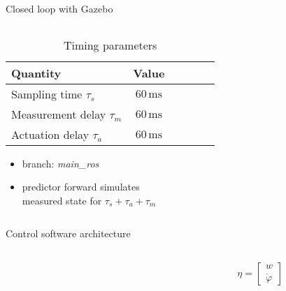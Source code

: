 \documentclass[10pt,aspectratio=1610]{beamer} %
\begin{document}
\begin{frame}{Closed loop with Gazebo }
	\begin{columns}[onlytextwidth]
		\begin{column}{0.5\textwidth}	
			\begin{table}[h!tbp]
				\small
				\begin{center}
					\begin{tabular}{lccccl}\toprule
						\textbf{Quantity} & \textbf{Value}\\
						\midrule
						Sampling time $\tau_{s}$ &$60\,\mathrm{ms}$\\
						Measurement delay $\tau_{m}$ & $60\,\mathrm{ms}$  \\
						Actuation delay $\tau_{a}$ & $60\,\mathrm{ms}$ \\
						\bottomrule
					\end{tabular}
				\end{center}
				\caption{Timing parameters}
			\end{table}
			\begin{itemize}[label=\textbullet]
				\item branch: \textit{main\_ros}
				\item predictor forward simulates \\measured state for $\tau_{s} + \tau_{a} + \tau_{m}$
			\end{itemize}
		\end{column}

		\begin{column}{0.5\textwidth}
			\begin{center}
			\def\svgwidth{1.0\textwidth}
			
			\end{center}
		\end{column}
	\end{columns}
\end{frame}

\begin{frame}{Control software architecture}
	\begin{columns}[onlytextwidth]
	\begin{column}{0.95\textwidth}
	\begin{center}
		\def\svgwidth{0.85\textwidth}
		
		\end{center}

	\end{column}

	\begin{column}{0.05\textwidth}
		\begin{align*}
			\eta =\begin{bmatrix}
				w\\
				\dot{\varphi}
			\end{bmatrix} 
		\end{align*}
	\end{column}
\end{columns}
\end{frame}
\end{document}
